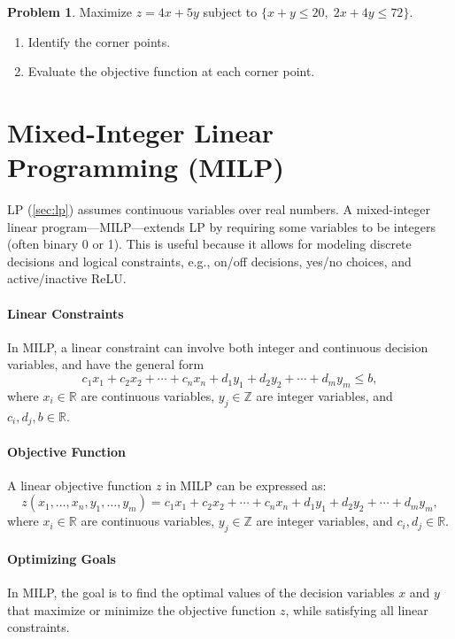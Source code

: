 \documentclass[oneside,11pt,dvipsnames]{book}
\numberwithin{equation}{section}
\theoremstyle{definition}
\newtheorem{problem}{Problem}[section]
\theoremstyle{remark}
\begin{document}
\begin{problem}\label{ex:lp-problem2}
    Maximize $z=4x+5y$ subject to $\{x+y \le 20, \; 2x+4y \leq 72\}$.

    \begin{enumerate}
        \item Identify the corner points.
        \item Evaluate the objective function at each corner point.
    \end{enumerate}
\end{problem}


\section{Mixed-Integer Linear Programming (MILP)}\label{sec:milp-basics}

LP (\autoref{sec:lp}) assumes continuous variables over real numbers.
A mixed-integer linear program---MILP---extends LP by requiring some variables to be integers (often binary 0 or 1).  This is useful because it allows for modeling discrete decisions and logical constraints, e.g., on/off decisions, yes/no choices, and active/inactive ReLU.

\paragraph{Linear Constraints}
In MILP, a linear constraint can involve both integer and continuous decision variables, and have the general form
\[
c_1x_1 + c_2x_2 + \cdots + c_nx_n + d_1y_1 + d_2y_2 + \cdots + d_my_m \leq b,
\]
where $x_i \in \mathbb{R}$ are continuous variables, $y_j \in \mathbb{Z}$ are integer variables, and $c_i, d_j, b \in \mathbb{R}$.

\paragraph{Objective Function}
A linear objective function $z$ in MILP can be expressed as:
\[
z(x_1, \ldots, x_n, y_1, \ldots, y_m) = c_1x_1 + c_2x_2 + \cdots + c_nx_n + d_1y_1 + d_2y_2 + \cdots + d_my_m,
\]
where $x_i \in \mathbb{R}$ are continuous variables, $y_j \in \mathbb{Z}$ are integer variables, and $c_i, d_j \in \mathbb{R}$.

\paragraph{Optimizing Goals}
In MILP, the goal is to find the optimal values of the decision variables $x$ and $y$ that maximize or minimize the objective function $z$, while satisfying all linear constraints.
\end{document}
